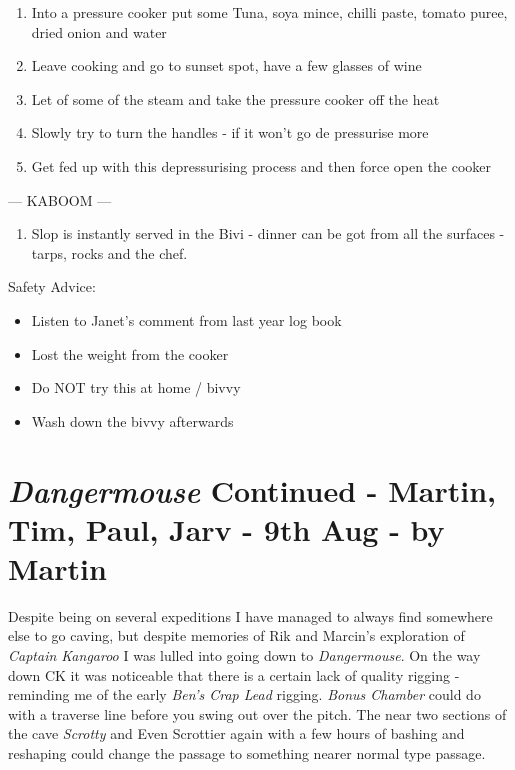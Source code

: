 \begin{enumerate}
\def\labelenumi{\arabic{enumi}.}
\tightlist
\item
  Into a pressure cooker put some Tuna, soya mince, chilli paste, tomato
  puree, dried onion and water
\item
  Leave cooking and go to sunset spot, have a few glasses of wine
\item
  Let of some of the steam and take the pressure cooker off the heat
\item
  Slowly try to turn the handles - if it won't go de pressurise more
\item
  Get fed up with this depressurising process and then force open the
  cooker
\end{enumerate}

--- KABOOM ---

\begin{enumerate}
\def\labelenumi{\arabic{enumi}.}
\setcounter{enumi}{5}
\tightlist
\item
  Slop is instantly served in the Bivi - dinner can be got from all the
  surfaces - tarps, rocks and the chef.
\end{enumerate}

Safety Advice:

\begin{itemize}
\tightlist
\item
  Listen to Janet's comment from last year log book
\item
  Lost the weight from the cooker
\item
  Do NOT try this at home / bivvy
\item
  Wash down the bivvy afterwards
\end{itemize}


\hypertarget{dangermouse-continued---martin-tim-paul-jarv---9th-aug---by-martin}{%
\section{\texorpdfstring{\emph{Dangermouse} Continued - Martin, Tim,
Paul, Jarv - 9th Aug - by
Martin}{Dangermouse Continued - Martin, Tim, Paul, Jarv - 9th Aug - by Martin}}\label{dangermouse-continued---martin-tim-paul-jarv---9th-aug---by-martin}}

Despite being on several expeditions I have managed to always find
somewhere else to go caving, but despite memories of Rik and Marcin's
exploration of \emph{Captain Kangaroo} I was lulled into going down to
\emph{Dangermouse}. On the way down CK it was noticeable that there is a
certain lack of quality rigging - reminding me of the early \emph{Ben's
Crap Lead}
rigging. \emph{Bonus Chamber} could do with a traverse line before you
swing out over the pitch. The near two sections of the cave
\emph{Scrotty} and Even Scrottier again with a few hours of bashing and
reshaping could change the passage to something nearer normal type
passage.

